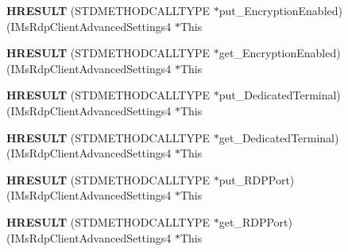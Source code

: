 \begin{DoxyCompactItemize}
\mbox{\label{struct_i_ms_rdp_client_advanced_settings4_vtbl_af31487353dcc4b42e3338231284c62eb}} 
{\bfseries H\+R\+E\+S\+U\+LT} (S\+T\+D\+M\+E\+T\+H\+O\+D\+C\+A\+L\+L\+T\+Y\+PE $\ast$put\+\_\+\+Encryption\+Enabled)(I\+Ms\+Rdp\+Client\+Advanced\+Settings4 $\ast$This
\item 
\mbox{\label{struct_i_ms_rdp_client_advanced_settings4_vtbl_a44675f3fd559dfdc6a6ada4e949e1f1f}} 
{\bfseries H\+R\+E\+S\+U\+LT} (S\+T\+D\+M\+E\+T\+H\+O\+D\+C\+A\+L\+L\+T\+Y\+PE $\ast$get\+\_\+\+Encryption\+Enabled)(I\+Ms\+Rdp\+Client\+Advanced\+Settings4 $\ast$This
\item 
\mbox{\label{struct_i_ms_rdp_client_advanced_settings4_vtbl_a9d41ef43590b11a034488608df5c1977}} 
{\bfseries H\+R\+E\+S\+U\+LT} (S\+T\+D\+M\+E\+T\+H\+O\+D\+C\+A\+L\+L\+T\+Y\+PE $\ast$put\+\_\+\+Dedicated\+Terminal)(I\+Ms\+Rdp\+Client\+Advanced\+Settings4 $\ast$This
\item 
\mbox{\label{struct_i_ms_rdp_client_advanced_settings4_vtbl_a4e8dfbde60aa2f6056668abe664a898b}} 
{\bfseries H\+R\+E\+S\+U\+LT} (S\+T\+D\+M\+E\+T\+H\+O\+D\+C\+A\+L\+L\+T\+Y\+PE $\ast$get\+\_\+\+Dedicated\+Terminal)(I\+Ms\+Rdp\+Client\+Advanced\+Settings4 $\ast$This
\item 
\mbox{\label{struct_i_ms_rdp_client_advanced_settings4_vtbl_a708e47fa6c59dfe08657aaadff72a0e4}} 
{\bfseries H\+R\+E\+S\+U\+LT} (S\+T\+D\+M\+E\+T\+H\+O\+D\+C\+A\+L\+L\+T\+Y\+PE $\ast$put\+\_\+\+R\+D\+P\+Port)(I\+Ms\+Rdp\+Client\+Advanced\+Settings4 $\ast$This
\item 
\mbox{\label{struct_i_ms_rdp_client_advanced_settings4_vtbl_a9dceac1df2d54166ee85d1488028c010}} 
{\bfseries H\+R\+E\+S\+U\+LT} (S\+T\+D\+M\+E\+T\+H\+O\+D\+C\+A\+L\+L\+T\+Y\+PE $\ast$get\+\_\+\+R\+D\+P\+Port)(I\+Ms\+Rdp\+Client\+Advanced\+Settings4 $\ast$This
\item 
\mbox{\label{struct_i_ms_rdp_client_advanced_settings4_vtbl_aeefd52c86fbfd46c1ea3361cee4b075f}} 

\end{DoxyCompactItemize}
